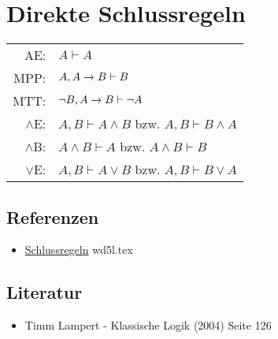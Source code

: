 \documentclass{sajzk}
\begin{document}
\section{Direkte Schlussregeln}
\label{3rqj}

\begin{center}
    \begin{tabular}{rl}
        AE:       & $A\vdash A$ \\
        MPP:      & $A, A\rightarrow B\vdash B$ \\
        MTT:      & $\lnot B, A\rightarrow B\vdash \lnot A$ \\
        $\land$E: & $A, B \vdash A \land B$ \hspace{1ex}bzw. $A, B \vdash B \land A$ \\
        $\land$B: & $A \land B \vdash A$ \hspace{1ex}bzw. $A \land B \vdash B$ \\
        $\lor$E:  & $A, B \vdash A \lor B$ \hspace{1ex}bzw. $A, B \vdash B \lor A$ \\
    \end{tabular}
\end{center}

\subsection{Referenzen}
\begin{itemize}
    \item \href{wd5l.pdf}{Schlussregeln} wd5l.tex
\end{itemize}

\subsection{Literatur}
\begin{itemize}
    \item Timm Lampert - Klassische Logik (2004) Seite 126
\end{itemize}
\end{document}
